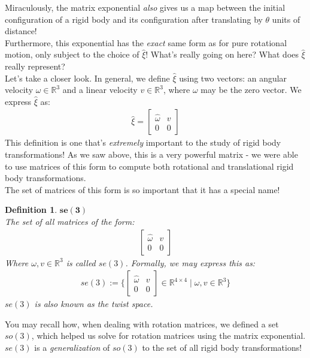 \documentclass[oneside]{book}
\newtheorem{definition}{Definition}
\newenvironment{defn} %
  {\colorlet{shadecolor}{orange!15}\begin{shaded}\begin{definition}}
  {\end{definition}\end{shaded}}
\begin{document}
Miraculously, the matrix exponential \textit{also} gives us a map between the initial configuration of a rigid body and its configuration after translating by $\theta$ units of distance!\\
Furthermore, this exponential has the \textit{exact} same form as for pure rotational motion, only subject to the choice of $\hat\xi$! What's really going on here? What does $\hat\xi$ really represent?\\
Let's take a closer look. In general, we define $\hat\xi$ using two vectors: an angular velocity $\omega \in \mathbb{R}^3$ and a linear velocity $v \in \mathbb{R}^3$, where $\omega$ may be the zero vector. We express $\hat\xi$ as:
\begin{align}
    \hat \xi
    = 
    \begin{bmatrix}
        \hat\omega & v\\
        0 & 0
    \end{bmatrix}
\end{align}
This definition is one that's \textit{extremely} important to the study of rigid body transformations! As we saw above, this is a very powerful matrix - we were able to use matrices of this form to compute both rotational and translational rigid body transformations.\\
The set of matrices of this form is so important that it has a special name!
\begin{defn}
$\mathbf{se(3)}$\\
The set of all matrices of the form:
\begin{align}
    \begin{bmatrix}
        \hat\omega & v\\
        0 & 0
    \end{bmatrix}
\end{align}
Where $\omega, v \in \mathbb{R}^3$ is called $se(3)$. Formally, we may express this as:
\begin{align}
    se(3) := \Big\{ \begin{bmatrix}
        \hat\omega & v\\
        0 & 0
    \end{bmatrix} \in \mathbb{R}^{4\times 4} \; \Big | \; \omega, v \in \mathbb{R}^3 \Big\}
\end{align}
$se(3)$ is also known as the twist space.
\end{defn}
\noindent
You may recall how, when dealing with rotation matrices, we defined a set $so(3)$, which helped us solve for rotation matrices using the matrix exponential. $se(3)$ is a \textit{generalization} of $so(3)$ to the set of all rigid body transformations!\\
\end{document}

